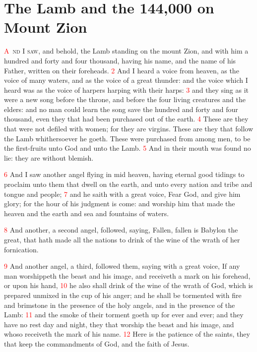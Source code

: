 \documentclass[12pt,twoside]{memoir}
\newcommand{\vnum}[1]{\textcolor{red}{\normalsize{#1}}}
\begin{document}

\chapter{The Lamb and the 144,000 on Mount Zion}
\lettrine[lines=3,slope=-0.5em]{\textcolor{red}{A}}{\ nd I saw}, and behold, the Lamb standing on the mount Zion, and with him a hundred and forty and four thousand, having his name, and the name of his Father, written on their foreheads. 
\vnum{2} And I heard a voice from heaven, as the voice of many waters, and as the voice of a great thunder: and the voice which I heard was as the voice of harpers harping with their harps: 
\vnum{3} and they sing as it were a new song before the throne, and before the four living creatures and the elders: and no man could learn the song save the hundred and forty and four thousand, even they that had been purchased out of the earth. 
\vnum{4} These are they that were not defiled with women; for they are virgins. These are they that follow the Lamb whithersoever he goeth. These were purchased from among men, to be the first-fruits unto God and unto the Lamb. 
\vnum{5} And in their mouth was found no lie: they are without blemish.

\vnum{6} And I saw another angel flying in mid heaven, having eternal good tidings to proclaim unto them that dwell on the earth, and unto every nation and tribe and tongue and people; 
\vnum{7} and he saith with a great voice, Fear God, and give him glory; for the hour of his judgment is come: and worship him that made the heaven and the earth and sea and fountains of waters.

\vnum{8} And another, a second angel, followed, saying, Fallen, fallen is Babylon the great, that hath made all the nations to drink of the wine of the wrath of her fornication.

\vnum{9} And another angel, a third, followed them, saying with a great voice, If any man worshippeth the beast and his image, and receiveth a mark on his forehead, or upon his hand, 
\vnum{10} he also shall drink of the wine of the wrath of God, which is prepared unmixed in the cup of his anger; and he shall be tormented with fire and brimstone in the presence of the holy angels, and in the presence of the Lamb: 
\vnum{11} and the smoke of their torment goeth up for ever and ever; and they have no rest day and night, they that worship the beast and his image, and whoso receiveth the mark of his name. 
\vnum{12} Here is the patience of the saints, they that keep the commandments of God, and the faith of Jesus.
\end{document}
